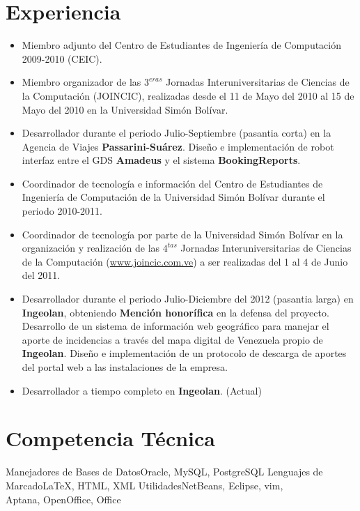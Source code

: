 \documentclass[10pt,a4paper]{moderncv}
\begin{document}
\section{Experiencia}
	\begin{itemize}
	   \item Miembro adjunto del Centro de Estudiantes de Ingenier\'ia de 
             Computaci\'on 2009-2010 (CEIC).
	   \item Miembro organizador de las $3^{eras}$ Jornadas Interuniversitarias 
             de Ciencias de la Computaci\'on (JOINCIC), realizadas desde el 11 
             de Mayo del 2010 al 15 de Mayo del 2010 en la Universidad Sim\'on 
             Bol\'ivar. 
       \item Desarrollador durante el periodo Julio-Septiembre (pasantia 
             corta) en la Agencia de Viajes \textbf{Passarini-Su\'arez}. 
             Dise\~no e implementaci\'on de robot interfaz entre el GDS 
             \textbf{Amadeus} y el sistema \textbf{BookingReports}.
       \item Coordinador de tecnolog\'ia e informaci\'on del Centro de 
             Estudiantes de Ingenier\'ia de Computaci\'on de la Universidad 
             Sim\'on Bol\'ivar durante el periodo 2010-2011.
       \item Coordinador de tecnolog\'ia por parte de la Universidad Sim\'on 
             Bol\'ivar en la organizaci\'on y realizaci\'on de las $4^{tas}$ 
             Jornadas Interuniversitarias de Ciencias de la Computaci\'on 
             (\url{www.joincic.com.ve}) a ser realizadas del 1 al 4 de Junio 
             del 2011.
       \item Desarrollador durante el periodo Julio-Diciembre del 2012 
            (pasantia larga) en \textbf{Ingeolan}, obteniendo 
            \textbf{Menci\'on honor\'ifica} en la defensa del proyecto. 
            Desarrollo de un sistema de informaci\'on web geogr\'afico para 
            manejar el aporte de incidencias a trav\'es del mapa digital de 
            Venezuela propio de \textbf{Ingeolan}. Dise\~no e implementaci\'on 
            de un protocolo de descarga de aportes del portal web a las 
            instalaciones de la empresa.
       \item Desarrollador a tiempo completo en \textbf{Ingeolan}. (Actual)
    \end{itemize}

\newpage

\section{Competencia T\'ecnica}
				{Manejadores de Bases de Datos}{Oracle, MySQL, PostgreSQL}
				{Lenguajes de Marcado}{LaTeX, HTML, XML}
				{Utilidades}{NetBeans, Eclipse, vim, \\ Aptana, OpenOffice, Office}	
\end{document}
